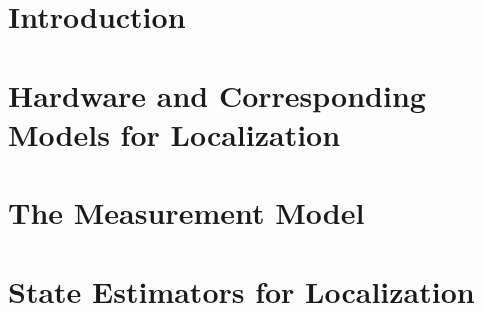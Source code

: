 \documentclass[a4paper, 12pt]{paper}
\begin{document}
\section{Introduction}

\pagebreak
\section{Hardware and Corresponding Models for Localization}

\pagebreak
\section{The Measurement Model}

\pagebreak
\section{State Estimators for Localization}\label{sec:state-estimators}

\pagebreak

\end{document}
